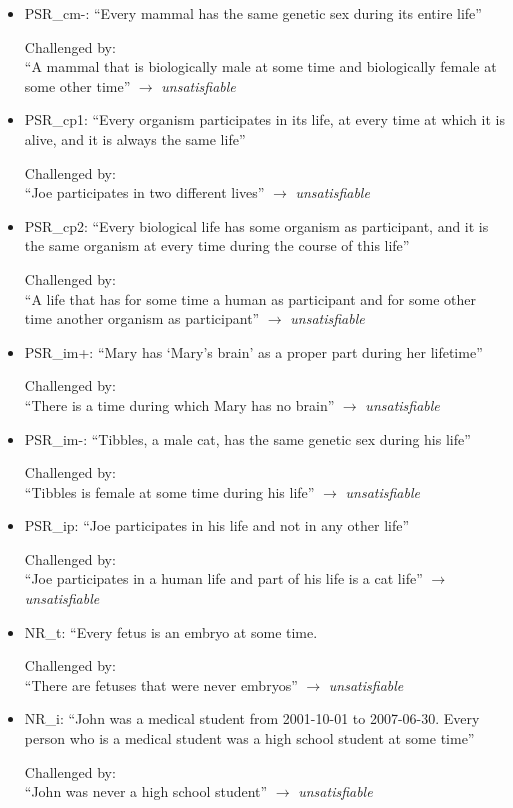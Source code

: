 \begin{itemize}
\item PSR\_cm-: ``Every mammal has the same genetic sex during its entire life''

Challenged by: \\``A mammal that is biologically male at some time and biologically female at some other time''  
$\rightarrow$ \emph{unsatisfiable}

 
\item PSR\_cp1: ``Every organism participates in its life, at every time at which it is alive, and it is always the same life''

Challenged by: \\``Joe participates in two different lives''  
$\rightarrow$ \emph{unsatisfiable}


\item PSR\_cp2: ``Every biological life has some organism as participant, and it is the same organism at every time during the course of this life''

Challenged by: \\``A life that has for some time a human as participant and for some other time another organism as participant''  
$\rightarrow$ \emph{unsatisfiable}


\item PSR\_im+: ``Mary has `Mary's brain' as a proper part during her lifetime''

Challenged by: \\``There is a time during which Mary has no brain''  
$\rightarrow$ \emph{unsatisfiable}


\item PSR\_im-: ``Tibbles, a male cat, has the same genetic sex during his life'' 

Challenged by: \\``Tibbles is female at some time during his life''  
$\rightarrow$ \emph{unsatisfiable}


\item PSR\_ip: ``Joe participates in his life and not in any other life''

Challenged by: \\``Joe participates in a human life and part of his life is a cat life''  
$\rightarrow$ \emph{unsatisfiable}




\item NR\_t: ``Every fetus is an embryo at some time. 

Challenged by: \\ ``There are fetuses that were never embryos''  
$\rightarrow$ \emph{unsatisfiable}


\item NR\_i: ``John was a medical student from 2001-10-01 to 2007-06-30. Every person who is a medical student was a high school student at some time''

Challenged by: \\ ``John was never a high school student''
 $\rightarrow$ \emph{unsatisfiable}

\end{itemize}

